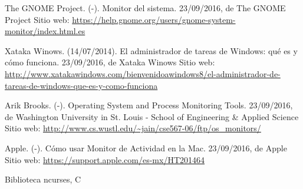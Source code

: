 \documentclass[a4paper,11pt]{article}
\begin{document}
\begin{thebibliography}{}

  The GNOME Project.
  (-).
  Monitor del sistema.
  23/09/2016, 
  de The GNOME Project 
  Sitio web:   \url{https://help.gnome.org/users/gnome-system-monitor/index.html.es}

  Xataka Winows. 
  (14/07/2014). 
  El administrador de tareas de Windows: qué es y cómo funciona. 
  23/09/2016, de Xataka Winows 
  Sitio web: \url{http://www.xatakawindows.com/bienvenidoawindows8/el-administrador-de-tareas-de-windows-que-es-y-como-funciona}

  Arik Brooks. 
  (-). 
  Operating System and Process Monitoring Tools. 
  23/09/2016, de Washington University in St. Louis - School of Engineering \& Applied Science 
  Sitio web: \url{http://www.cs.wustl.edu/~jain/cse567-06/ftp/os_monitors/}

  Apple. 
  (-). 
  Cómo usar Monitor de Actividad en la Mac. 
  23/09/2016, de Apple 
  Sitio web: \url{https://support.apple.com/es-mx/HT201464}

\end{thebibliography}

Biblioteca ncurses, C
\end{document}
